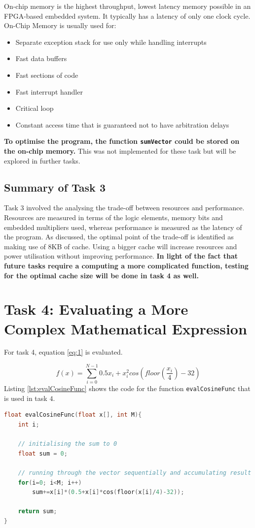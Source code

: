 \documentclass{article}
\begin{document}
On-chip memory is the highest throughput, lowest latency memory possible in an FPGA-based embedded system. It typically has a latency of only one clock cycle\cite{highest_throughput}. On-Chip Memory is usually used for:
\begin{itemize}
  \item Separate exception stack for use only while handling interrupts 
  \item Fast data buffers
  \item Fast sections of code
  \item Fast interrupt handler
  \item Critical loop
  \item Constant access time that is guaranteed not to have arbitration delays\cite{on-chip_memory}
\end{itemize}
\textbf{To optimise the program, the function {\tt sumVector} could be stored on the on-chip memory.} This was not implemented for these task but will be explored in further tasks. 

\subsection{Summary of Task 3}
Task 3 involved the analysing the trade-off between resources and performance. Resources are measured in terms of the logic elements, memory bits and embedded multipliers used, whereas performance is measured as the latency of the program. As discussed, the optimal point of the trade-off is identified as making use of 8KB of cache. Using a bigger cache will increase resources and power utilisation without improving performance. \textbf{In light of the fact that future tasks require a computing a more complicated function, testing for the optimal cache size will be done in task 4 as well.}

\newpage
\section{Task 4: Evaluating a More Complex Mathematical Expression}
For task 4, equation \ref{eq:1} is evaluated.

\begin{equation}
    f(x) = \sum_{i=0}^{N-1}0.5 x_{i} + x_{i}^{2}cos(floor(\frac{x_{i}}{4})-32)\label{eq:1}
\end{equation}
Listing \ref{lst:evalCosineFunc} shows the code for the function {\tt evalCosineFunc} that is used in task $4$. 

\begin{lstlisting}[language=C, frame=single, caption={\tt evalCosineFunc} function, label=lst:evalCosineFunc]
float evalCosineFunc(float x[], int M){
	int i;
	
	// initialising the sum to 0
	float sum = 0;
	
	// running through the vector sequentially and accumulating result in sum
	for(i=0; i<M; i++)
		sum+=x[i]*(0.5+x[i]*cos(floor(x[i]/4)-32));
	
	return sum;
}
\end{lstlisting}
\end{document}
